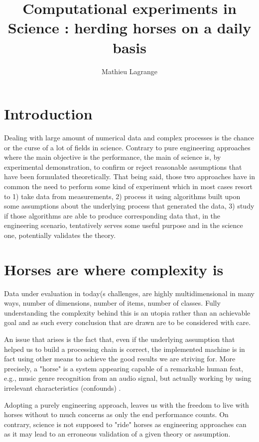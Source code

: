 \documentclass[a4paper,fleqn]{tufte-handout}
\title{Computational experiments in Science : herding horses on a daily basis}
\author{Mathieu Lagrange}
\begin{document}
\maketitle

\section{Introduction}

Dealing with large amount of numerical data and complex processes is the chance or the curse of a lot of fields in science. Contrary to pure engineering approaches where the main objective is the performance, the main of science is, by experimental demonstration, to confirm or reject reasonable assumptions that have been formulated theoretically. That being said, those two approaches have in common the need to perform some kind of experiment which in most cases resort to 1) take data from measurements, 2) process it using algorithms built upon some assumptions about the underlying process that generated the data, 3) study if those algorithms are able to produce corresponding data that, in the engineering scenario, tentatively serves some useful purpose and in the science one, potentially validates the theory.


\section{Horses are where complexity is}

Data under evaluation in today(s challenges, are highly multidimensional in many ways, number of dimensions, number of items, number of classes. Fully understanding the complexity behind this is an utopia rather than an achievable goal and as such every conclusion that are drawn are to be considered with care.

An issue that arises is the fact that, even if the underlying assumption that helped us to build a processing chain is correct, the implemented machine is in fact using other means to achieve the good results we are striving for. More precisely, a "horse" is a system appearing capable of a remarkable human feat, e.g., music genre recognition from an audio signal, but actually working by using irrelevant characteristics (confounds) \citep{6847693}.

Adopting a purely engineering approach, leaves us with the freedom to live with horses without to much concerns as only the end performance counts. On contrary, science is not supposed to "ride" horses as engineering approaches can as it may lead to an erroneous validation of a given theory or assumption.
\end{document}
